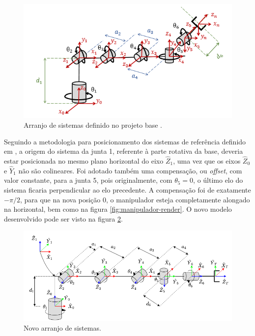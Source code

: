 \begin{figure}[htb]
    \caption{Arranjo de sistemas definido no projeto base \cite{fernando2019assistivo}.}    
    \begin{centering}

        \includegraphics[width=0.8\columnwidth]{images/arm/Refframes-original.png}
    
    \par\end{centering}

    \label{fig:DH-Base}
\end{figure}

Seguindo a metodologia para posicionamento dos sistemas de referência definido em 
\cite{craig2009introduction}, a origem do sistema da junta 1, referente à parte
rotativa da base, deveria estar posicionada no mesmo plano horizontal
do eixo $\hat{Z}_1$, uma vez que os eixos $\hat{Z}_0$ e $\hat{Y}_1$ não são colineares. 
Foi adotado também uma compensação, ou \textit{offset},
com valor constante, para a junta 5, pois originalmente, com $\theta_5=0$, o 
último elo do sistema ficaria perpendicular ao elo precedente. A compensação
foi de exatamente $-\pi/2$, para que na nova posição 0, o manipulador esteja 
completamente alongado na horizontal, bem como na figura \ref{fig:manipulador-render}.
O novo modelo desenvolvido pode ser visto na figura \ref{fig:DH-Novo}. 

\begin{figure}[htb]
    \caption{Novo arranjo de sistemas.}    
    \begin{centering}

        \includegraphics[width=0.8\columnwidth]{images/arm/RefFrames.png}
    
    \par\end{centering}

    \label{fig:DH-Novo}
\end{figure}

